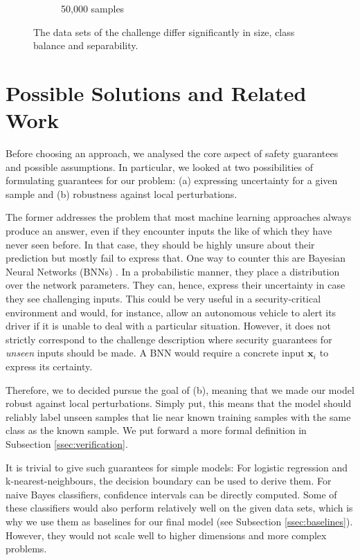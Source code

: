 \documentclass[acmsmall,nonacm]{acmart}
\begin{document}
\begin{figure}
\begin{subfigure}{.32\textwidth}
  \caption{50,000 samples}
\end{subfigure}
\caption{The data sets of the challenge differ significantly in size, class balance and separability.}
\label{fig:datasets}
\end{figure}


\section{Possible Solutions and Related Work}

Before choosing an approach, we analysed the core aspect of safety guarantees and possible assumptions. In particular, we looked at two possibilities of formulating guarantees for our problem: (a) expressing uncertainty for a given sample and (b) robustness against local perturbations. 

The former addresses the problem that most machine learning approaches always produce an answer, even if they encounter inputs the like of which they have never seen before. In that case, they should be highly unsure about their prediction but mostly fail to express that. One way to counter this are Bayesian Neural Networks (BNNs) \cite{goan2020bnn}. In a probabilistic manner, they place a distribution over the network parameters. They can, hence, express their uncertainty in case they see challenging inputs. This could be very useful in a security-critical environment and would, for instance, allow an autonomous vehicle to alert its driver if it is unable to deal with a particular situation. However, it does not strictly correspond to the challenge description where security guarantees for \textit{unseen} inputs should be made. A BNN would require a concrete input $\mathbf{x}_i$ to express its certainty.

Therefore, we to decided pursue the goal of (b), meaning that we made our model robust against local perturbations. Simply put, this means that the model should reliably label unseen samples that lie near known training samples with the same class as the known sample. We put forward a more formal definition in Subsection \ref{ssec:verification}. 

It is trivial to give such guarantees for simple models: For logistic regression and k-nearest-neighbours, the decision boundary can be used to derive them. For naive Bayes classifiers, confidence intervals can be directly computed. Some of these classifiers would also perform relatively well on the given data sets, which is why we use them as baselines for our final model (see Subsection \ref{ssec:baselines}). However, they would not scale well to higher dimensions and more complex problems. 
\end{document}
